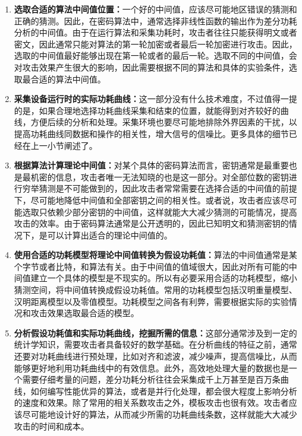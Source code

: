 \begin{enumerate}
\item \textbf{选取合适的算法中间值位置：}一个好的中间值，应该尽可能地区错误的猜测和正确的猜测。因此，在密码算法中，通常选择非线性函数的输出作为差分功耗分析的中间值。由于在运行算法和采集功耗时，攻击者往往只能获得明文或者密文，因此通常只能对算法的第一轮加密或者最后一轮加密进行攻击。因此，选取的中间值最好能够出现在第一轮或者的最后一轮。选取不同的中间值，会对攻击效果产生很大的影响，因此需要根据不同的算法和具体的实验条件，选取最合适的算法中间值。
\item \textbf{采集设备运行时的实际功耗曲线：}这一部分没有什么技术难度，不过值得一提的是，如果合理地选择功耗曲线采集和结束的位置，就能得到对齐较好的曲线，方便后续的分析和处理。采集环境也要尽可能地排除外界因素的干扰，以提高功耗曲线同数据和操作的相关性，增大信号的信噪比。更多具体的细节已经在上一小节阐述了。
\item \textbf{根据算法计算理论中间值：}对某个具体的密码算法而言，密钥通常是最重要也是最机密的信息，攻击者唯一无法知晓的也是这一部分。对全部位数的密钥进行穷举猜测是不可能做到的，因此攻击者常常需要在选择合适的中间值的前提下，尽可能地降低中间值和全部密钥之间的相关性。或者说，攻击者应该尽可能选取只依赖少部分密钥的中间值，这样就能大大减少猜测的可能情况，提高攻击的效率。由于密码算法通常是公开透明的，因此已知明文和猜测密钥的情况下，是可以计算出适合的理论中间值的。
\item \textbf{使用合适的功耗模型将理论中间值转换为假设功耗值：}算法的中间值通常是某个字节或者比特，和算法有关。由于中间值的值域很大，因此对所有可能的中间值建立一个具体的模型是不现实的。所以有必要采用合适的功耗模型，缩小猜测空间，将中间值转换成假设功耗值。常用的功耗模型包括汉明重量模型、汉明距离模型以及零值模型。功耗模型之间各有利弊，需要根据实际的实验情况和攻击效果选取最合适的模型。
\item \textbf{分析假设功耗值和实际功耗曲线，挖掘所需的信息：}这部分通常涉及到一定的统计学知识，需要攻击者具备较好的数学基础。在分析曲线的特征之前，通常还要对功耗曲线进行预处理，比如对齐和滤波，减少噪声，提高信噪比，从而能够更好地利用功耗曲线中的有效信息。此外，高效地处理大量的数据也是一个需要仔细考量的问题，差分功耗分析往往会采集成千上万甚至是百万条曲线，如何编写性能优异的算法，或者是并行化处理，都会很大程度上影响分析的速度和效果。除了常用的相关系数攻击之外，模板攻击也很有效。攻击者应该尽可能地设计好的算法，从而减少所需的功耗曲线条数，这样就能大大减少攻击的时间和成本。
\end{enumerate}

\vspace*{\baselineskip}

